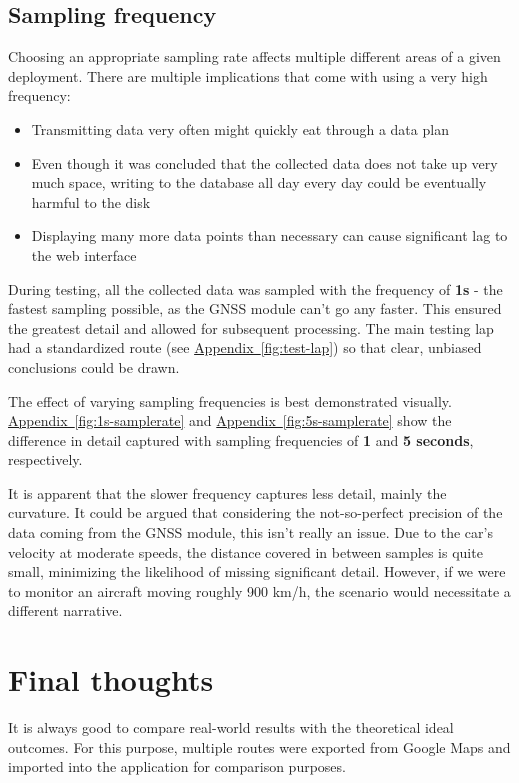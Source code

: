 \documentclass[FM,BP,EN,fonts]{tulthesis}
\newcommand{\aref}[1]{\hyperref[#1]{Appendix~\ref*{#1}}}
\begin{document}
\subsection{Sampling frequency}
Choosing an appropriate sampling rate affects multiple different areas of a given deployment. There are multiple implications that come with using a very high frequency:

\begin{itemize}
    \item Transmitting data very often might quickly eat through a data plan
    \item Even though it was concluded that the collected data does not take up very much space, writing to the database all day every day could be eventually harmful to the disk
    \item Displaying many more data points than necessary can cause significant lag to the web interface
\end{itemize}

During testing, all the collected data was sampled with the frequency of \textbf{1s} - the fastest sampling possible, as the GNSS module can't go any faster. This ensured the greatest detail and allowed for subsequent processing. The main testing lap had a standardized route (see \aref{fig:test-lap}) so that clear, unbiased conclusions could be drawn.

The effect of varying sampling frequencies is best demonstrated visually. \aref{fig:1s-samplerate} and \aref{fig:5s-samplerate} show the difference in detail captured with sampling frequencies of \textbf{1} and \textbf{5 seconds}, respectively. 

It is apparent that the slower frequency captures less detail, mainly the curvature. It could be argued that considering the not-so-perfect precision of the data coming from the GNSS module, this isn't really an issue. Due to the car's velocity at moderate speeds, the distance covered in between samples is quite small, minimizing the likelihood of missing significant detail. However, if we were to monitor an aircraft moving roughly 900 km/h, the scenario would necessitate a different narrative.

\section{Final thoughts}
It is always good to compare real-world results with the theoretical ideal outcomes. For this purpose, multiple routes were exported from Google Maps and imported into the application for comparison purposes. 
\end{document}
